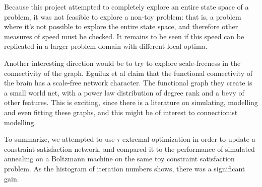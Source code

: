 \documentclass[12pt]{article}
\begin{document}
Because this project attempted to completely explore an entire state space of a problem, it was not feasible to explore a non-toy problem: that is, a problem where it's not possible to explore the entire state space, and therefore other measures of speed must be checked. It remains to be seen if this speed can be replicated in a larger problem domain with different local optima.

Another interesting direction would be to try to explore scale-freeness in the connectivity of the graph. Eguiluz et al\cite{funcnets} claim that the functional connectivity of the brain has a scale-free network character. The functional graph they create is a small world net\cite{smallworldnet}, with a power law distribution of degree rank and a bevy of other features. This is exciting, since there is a literature on simulating, modelling and even fitting these graphs, and this might be of interest to connectionist modelling.

To summarize, we attempted to use $\tau$-extremal optimization in order to update a constraint satisfaction network, and compared it to the performance of simulated annealing on a Boltzmann machine on the same toy constraint satisfaction problem. As the histogram of iteration numbers shows, there was a significant gain.
\end{document}
